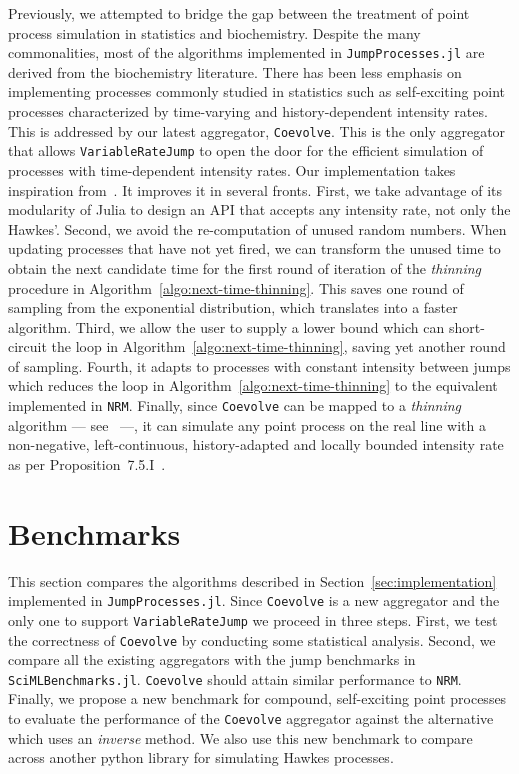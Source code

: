 \documentclass{juliacon}
\begin{document}
Previously, we attempted to bridge the gap between the treatment of point process simulation in statistics and biochemistry. Despite the many commonalities, most of the algorithms implemented in \texttt{JumpProcesses.jl} are derived from the biochemistry literature. There has been less emphasis on implementing processes commonly studied in statistics such as self-exciting point processes characterized by time-varying and history-dependent intensity rates. This is addressed by our latest aggregator, \texttt{Coevolve}. This is the only aggregator that allows \texttt{VariableRateJump} to open the door for the efficient simulation of processes with time-dependent intensity rates. Our implementation takes inspiration from~\cite{farajtabar2017}. It improves it in several fronts. First, we take advantage of its modularity of Julia to design an API that accepts any intensity rate, not only the Hawkes'. Second, we avoid the re-computation of unused random numbers. When updating processes that have not yet fired, we can transform the unused time to obtain the next candidate time for the first round of iteration of the \textit{thinning} procedure in Algorithm~\ref{algo:next-time-thinning}. This saves one round of sampling from the exponential distribution, which translates into a faster algorithm. Third, we allow the user to supply a lower bound which can short-circuit the loop in Algorithm~\ref{algo:next-time-thinning}, saving yet another round of sampling. Fourth, it adapts to processes with constant intensity between jumps which reduces the loop in Algorithm~\ref{algo:next-time-thinning} to the equivalent implemented in \texttt{NRM}. Finally, since \texttt{Coevolve} can be mapped to a \textit{thinning} algorithm --- see~\cite{farajtabar2017} ---, it can simulate any point process on the real line with a non-negative, left-continuous, history-adapted and locally bounded intensity rate as per Proposition~7.5.I~\cite{daley2003}.

\section{Benchmarks} \label{sec:benchmarks}

This section compares the algorithms described in Section~\ref{sec:implementation} implemented in \texttt{JumpProcesses.jl}. Since \texttt{Coevolve} is a new aggregator and the only one to support \texttt{VariableRateJump} we proceed in three steps. First, we test the correctness of \texttt{Coevolve} by conducting some statistical analysis. Second, we compare all the existing aggregators with the jump benchmarks in \texttt{SciMLBenchmarks.jl}. \texttt{Coevolve} should attain similar performance to \texttt{NRM}. Finally, we propose a new benchmark for compound, self-exciting point processes to evaluate the performance of the \texttt{Coevolve} aggregator against the alternative which uses an \textit{inverse} method. We also use this new benchmark to compare across another python library for simulating Hawkes processes.
\end{document}
